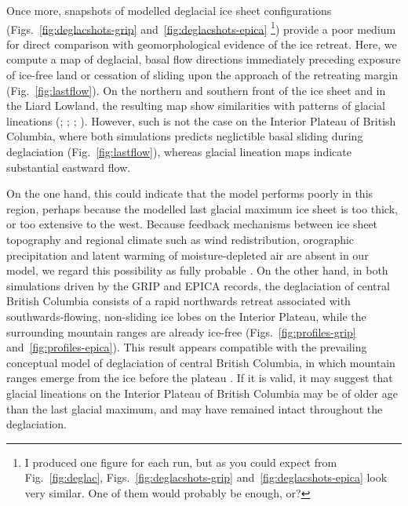 \documentclass[tc, manuscript]{copernicus}
\begin{document}
Once more, snapshots of modelled deglacial ice sheet configurations
(Figs.~\ref{fig:deglacshots-grip} and~\ref{fig:deglacshots-epica}%
\footnote{I produced one figure for each run, but as you could expect from
    Fig.~\ref{fig:deglac}, Figs.~\ref{fig:deglacshots-grip}
    and~\ref{fig:deglacshots-epica} look very similar. One of them would
    probably be enough, or?}) provide a
poor medium for direct comparison with geomorphological evidence of the ice
retreat. Here, we compute a map of deglacial, basal flow directions immediately
preceding exposure of ice-free land or cessation of sliding upon the approach
of the retreating margin (Fig.~\ref{fig:lastflow}). On the northern and
southern front of the ice sheet and in the Liard Lowland, the resulting map
show similarities with patterns of glacial lineations
(\citealp{Prest.etal.1968}; \citealp[Fig.~1.12]{Clague.1989};
\citealp[Fig.~2]{Kleman.etal.2010}; \citealp[Fig.~2]{Margold.etal.2013}).
However, such is not the case on the Interior Plateau of British Columbia,
where both simulations predicts neglictible basal sliding during deglaciation
(Fig.~\ref{fig:lastflow}), whereas glacial lineation maps indicate substantial
eastward flow.

On the one hand, this could indicate that the model performs poorly in this
region, perhaps because the modelled last glacial maximum ice sheet is too
thick, or too extensive to the west. Because feedback mechanisms between ice
sheet topography and regional climate such as wind redistribution, orographic
precipitation and latent warming of moisture-depleted air are absent in our
model, we regard this possibility as fully probable \citep{Seguinot.etal.2013}.
On the other hand, in both simulations driven by the GRIP and EPICA records,
the deglaciation of central British Columbia consists of a rapid northwards
retreat associated with southwards-flowing, non-sliding ice lobes on the
Interior Plateau, while the surrounding mountain ranges are already ice-free
(Figs.~\ref{fig:profiles-grip} and~\ref{fig:profiles-epica}). This result
appears compatible with the prevailing conceptual model of deglaciation of
central British Columbia, in which mountain ranges emerge from the ice before
the plateau \citep[Fig.~7]{Fulton.1991}. If it is valid, it may suggest that
glacial lineations on the Interior Plateau of British Columbia may be of older
age than the last glacial maximum, and may have remained intact throughout the
deglaciation.


\conclusions
\label{sec:concl}
\end{document}
